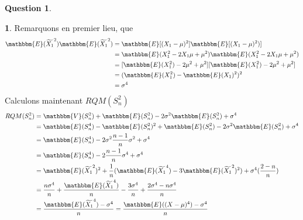 \documentclass[12pt]{article}
\newcommand{\1}{\mathbbm{1}}
\newcommand{\E}{\mathbbm{E}}
\newcommand{\V}{\mathbbm{V}}
\theoremstyle{definition}\newtheorem{defn}{Définition}
\theoremstyle{definition}\newtheorem{exm}{Exemple}
\theoremstyle{definition}\newtheorem{rem}{Remarque}
\theoremstyle{definition}\newtheorem{algo}{Algorithme}
\theoremstyle{remark}\newtheorem{exo}{Exercice}
\theoremstyle{remark}\newtheorem{nota}{Notation}
\theoremstyle{definition}\newtheorem{1q}{Question}
\theoremstyle{definition}\newtheorem{2q}{Question}
\theoremstyle{definition}\newtheorem{3q}{Question}
\theoremstyle{definition}\newtheorem{4q}{Question}
\theoremstyle{definition}\newtheorem{2qs1}{}
\theoremstyle{definition}\newtheorem{2qs2}{}
\theoremstyle{definition}\newtheorem{2qs3}{}
\theoremstyle{definition}\newtheorem{2qs4}{}
\theoremstyle{definition}\newtheorem{4qs2}{}
\theoremstyle{definition}\newtheorem{4qs3}{}
\begin{document}
\begin{4q}
\begin{4qs3}
Remarquons en premier lieu, que 
\begin{align*}
\E(\widetilde{X_1}^2)\E(\widetilde{X_1}^2) &= \E[(X_1 - \mu)^2]\E[(X_1 - \mu)^2)] \\
&= \E(X_1^2-2X_1\mu + \mu^2) \E(X_1^2-2X_1\mu + \mu^2)\\
&=[\E(X_1^2)-2\mu^2+\mu^2][\E(X_1^2)-2\mu^2+\mu^2]\\
&=(\E(X_1^2)-\E(X_1)^2)^2 \\
&=\sigma^4
\end{align*}
Calculons maintenant $RQM(S_n^2)$
\begin{align*}
RQM(S_n^2) &= \V(S_n^2) + \E(S_n^2) -2\sigma^2\E(S_n^2) + \sigma^4\\
&= \E(S_n^4) - \E(S_n^2)^2 + \E(S_n^2) -2\sigma^2\E(S_n^2) + \sigma^4\\
&= \E(S_n^4) - 2\sigma^2\frac{n-1}{n}\sigma^2 + \sigma^4\\
&= \E(S_n^4) - 2\frac{n-1}{n}\sigma^4 + \sigma^4\\
&= \E(\widetilde{X_1}^2)^2 +\frac{1}{n}(\E(\widetilde{X_1}^4) -3\E(\widetilde{X_1}^2)^2) +\sigma^4(\frac{2-n}{n})\\
&= \frac{n\sigma^4}{n} +\frac{\E(\widetilde{X_1}^4)}{n}-\frac{3\sigma^4}{n} + \frac{2\sigma^4-n\sigma^4}{n}\\
&= \frac{\E(\widetilde{X_1}^4)-\sigma^4}{n} = \frac{\E((X-\mu)^4)-\sigma^4}{n}\\
\end{align*}
\end{4qs3}


\end{4q}
\end{document}
